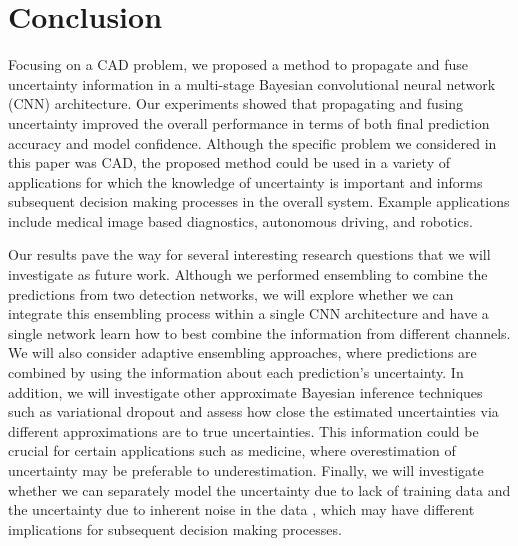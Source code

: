 \documentclass{article}
\begin{document}
\section{Conclusion}\label{sec:res}
Focusing on a CAD problem, we proposed a method to propagate and fuse uncertainty information in a multi-stage Bayesian convolutional neural network (CNN) architecture. Our experiments showed that propagating and fusing uncertainty improved the overall performance in terms of both final prediction accuracy and model confidence. Although the specific problem we considered in this paper was CAD, the proposed method could be used in a variety of applications for which the knowledge of uncertainty is important and informs subsequent decision making processes in the overall system. Example applications include medical image based diagnostics, autonomous driving, and robotics. 

Our results pave the way for several interesting research questions that we will investigate as future work. Although we performed ensembling to combine the predictions from two detection networks, we will explore whether we can integrate this ensembling process within a single CNN architecture and have a single network learn how to best combine the information from different channels. %
We will also consider adaptive ensembling approaches, where predictions are combined by using the information about each prediction's uncertainty. In addition, we will investigate other approximate Bayesian inference techniques such as variational dropout \cite{kingma_nips15} and assess how close the estimated uncertainties via different approximations are to true uncertainties. This information could be crucial for certain applications such as medicine, where overestimation of uncertainty may be preferable to underestimation. Finally, we will investigate whether we can separately model the uncertainty due to lack of training data and the uncertainty due to inherent noise in the data \cite{gal_arxiv17}, which may have different implications for subsequent decision making processes.

    



\end{document}
